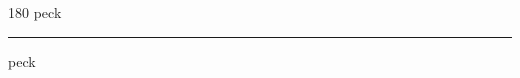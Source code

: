 
\begin{frame}
\begin{center}
\begin{turn}{180}
{\fontsize{2.5cm}{1em}\selectfont peck}
\end{turn}
\vspace{1em}\par  
\hrule
\vspace{1em}\par  
{\fontsize{2.5cm}{1em}\selectfont peck}
\end{center}
\end{frame}
